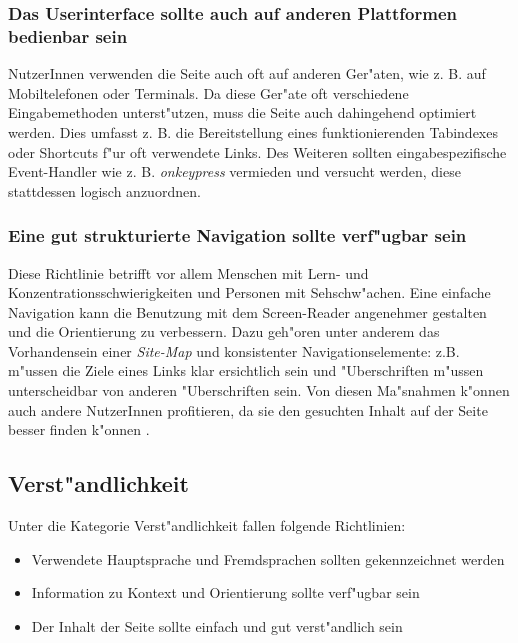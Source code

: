 \documentclass[a4paper,bibtotoc,oneside]{scrbook}
\begin{document}
\subsubsection{Das Userinterface sollte auch auf anderen Plattformen bedienbar sein}
NutzerInnen verwenden die Seite auch oft auf anderen Ger"aten, wie z. B. auf Mobiltelefonen oder Terminals. Da diese Ger"ate oft verschiedene Eingabemethoden unterst"utzen, muss die Seite auch dahingehend optimiert werden. Dies umfasst z. B. die Bereitstellung eines funktionierenden Tabindexes oder Shortcuts f"ur oft verwendete Links. Des Weiteren sollten eingabespezifische Event-Handler wie z. B. \emph{onkeypress} vermieden und versucht werden, diese stattdessen logisch anzuordnen. \cite[Abschnitt 6.9]{wcag1}

\subsubsection{Eine gut strukturierte Navigation sollte verf"ugbar sein}
Diese Richtlinie betrifft vor allem Menschen mit Lern- und Konzentrationsschwierigkeiten und Personen mit Sehschw"achen. Eine einfache Navigation kann die Benutzung mit dem Screen-Reader angenehmer gestalten und die Orientierung zu verbessern. Dazu geh"oren unter anderem das Vorhandensein einer \emph{Site-Map} und konsistenter Navigationselemente: z.B. m"ussen die Ziele eines Links klar ersichtlich sein und "Uberschriften m"ussen unterscheidbar von anderen "Uberschriften sein. \cite[Abschnitt 6.13]{wcag1}
Von diesen Ma"snahmen k"onnen auch andere NutzerInnen profitieren, da sie den gesuchten Inhalt auf der Seite besser finden k"onnen \cite[S. 52]{barr_webd}.

\subsection{Verst"andlichkeit}
Unter die Kategorie Verst"andlichkeit fallen folgende Richtlinien: 

\begin{itemize}
\item Verwendete Hauptsprache und Fremdsprachen sollten gekennzeichnet werden\cite[Abschnitt 6.4]{wcag1}
\item Information zu Kontext und Orientierung sollte verf"ugbar sein\cite[Abschnitt 6.12]{wcag1}
\item Der Inhalt der Seite sollte einfach und gut verst"andlich sein\cite[Abschnitt 6.14]{wcag1}
\end{itemize}
\end{document}
